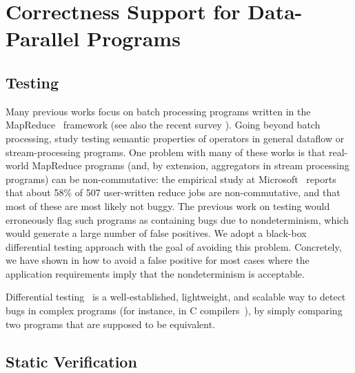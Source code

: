 
\section{Correctness Support for Data-Parallel Programs}

\subsection{Testing}

Many previous works focus on batch processing programs written in the MapReduce~\cite{dean2008mapreduce} framework \cite{csallner2011new,xu2013semantic,marynowski2012testing,chen2016commutativity} (see also the recent survey \cite{moran2019testing}). Going beyond batch processing, \cite{xu2013testing} study testing semantic properties of operators in general dataflow or stream-processing programs.
One problem with many of these works \cite{csallner2011new,xu2013semantic,xu2013testing,chen2016commutativity} is that real-world MapReduce programs (and, by extension, aggregators in stream processing programs) can be non-commutative: the empirical study at Microsoft~\cite{xiao2014nondeterminism} reports that about 58\% of 507 user-written reduce jobs are non-commutative, and that most of these are most likely not buggy. The previous work on testing would erroneously flag such programs as containing bugs due to nondeterminism, which would generate a large number of false positives.
We adopt a black-box differential testing approach with the goal of avoiding this problem. Concretely, we have shown in  how to avoid a false positive for most cases where the application requirements imply that the nondeterminism is acceptable.

Differential testing~\cite{mckeeman1998differential,groce2007randomized} is a well-established, lightweight, and scalable way to detect bugs in complex programs (for instance, in C compilers~\cite{yang2011finding}), by simply comparing two programs that are supposed to be equivalent.

\subsection{Static Verification}

